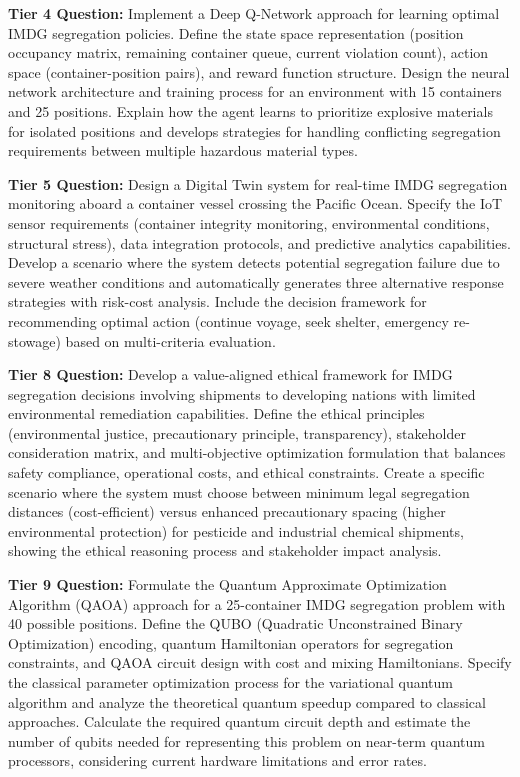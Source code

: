 \documentclass{article}
\begin{document}
\textbf{Tier 4 Question:} Implement a Deep Q-Network approach for learning optimal IMDG segregation policies. Define the state space representation (position occupancy matrix, remaining container queue, current violation count), action space (container-position pairs), and reward function structure. Design the neural network architecture and training process for an environment with 15 containers and 25 positions. Explain how the agent learns to prioritize explosive materials for isolated positions and develops strategies for handling conflicting segregation requirements between multiple hazardous material types.

\textbf{Tier 5 Question:} Design a Digital Twin system for real-time IMDG segregation monitoring aboard a container vessel crossing the Pacific Ocean. Specify the IoT sensor requirements (container integrity monitoring, environmental conditions, structural stress), data integration protocols, and predictive analytics capabilities. Develop a scenario where the system detects potential segregation failure due to severe weather conditions and automatically generates three alternative response strategies with risk-cost analysis. Include the decision framework for recommending optimal action (continue voyage, seek shelter, emergency re-stowage) based on multi-criteria evaluation.

\textbf{Tier 8 Question:} Develop a value-aligned ethical framework for IMDG segregation decisions involving shipments to developing nations with limited environmental remediation capabilities. Define the ethical principles (environmental justice, precautionary principle, transparency), stakeholder consideration matrix, and multi-objective optimization formulation that balances safety compliance, operational costs, and ethical constraints. Create a specific scenario where the system must choose between minimum legal segregation distances (cost-efficient) versus enhanced precautionary spacing (higher environmental protection) for pesticide and industrial chemical shipments, showing the ethical reasoning process and stakeholder impact analysis.

\textbf{Tier 9 Question:} Formulate the Quantum Approximate Optimization Algorithm (QAOA) approach for a 25-container IMDG segregation problem with 40 possible positions. Define the QUBO (Quadratic Unconstrained Binary Optimization) encoding, quantum Hamiltonian operators for segregation constraints, and QAOA circuit design with cost and mixing Hamiltonians. Specify the classical parameter optimization process for the variational quantum algorithm and analyze the theoretical quantum speedup compared to classical approaches. Calculate the required quantum circuit depth and estimate the number of qubits needed for representing this problem on near-term quantum processors, considering current hardware limitations and error rates.
\end{document}
